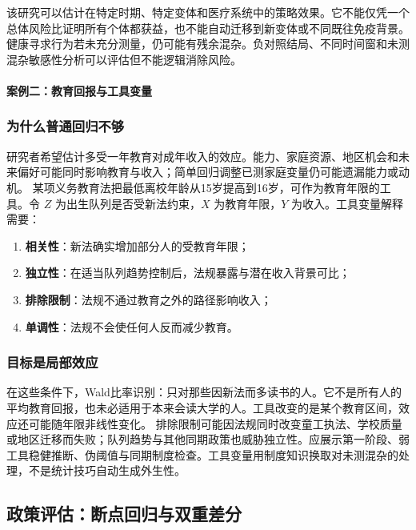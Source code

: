 该研究可以估计在特定时期、特定变体和医疗系统中的策略效果。它不能仅凭一个总体风险比证明所有个体都获益，也不能自动迁移到新变体或不同既往免疫背景。健康寻求行为若未充分测量，仍可能有残余混杂。负对照结局、不同时间窗和未测混杂敏感性分析可以评估但不能逻辑消除风险。

\paragraph{案例二：教育回报与工具变量}

\subsubsection{为什么普通回归不够}

研究者希望估计多受一年教育对成年收入的效应。能力、家庭资源、地区机会和未来偏好可能同时影响教育与收入；简单回归调整已测家庭变量仍可能遗漏能力或动机。
某项义务教育法把最低离校年龄从15岁提高到16岁，可作为教育年限的工具。令 $Z$ 为出生队列是否受新法约束，$X$ 为教育年限，$Y$ 为收入。工具变量解释需要：

\begin{enumerate}
  \item \textbf{相关性}：新法确实增加部分人的受教育年限；
  \item \textbf{独立性}：在适当队列趋势控制后，法规暴露与潜在收入背景可比；
  \item \textbf{排除限制}：法规不通过教育之外的路径影响收入；
  \item \textbf{单调性}：法规不会使任何人反而减少教育。
\end{enumerate}

\subsubsection{目标是局部效应}

在这些条件下，Wald比率识别：只对那些因新法而多读书的人。它不是所有人的平均教育回报，也未必适用于本来会读大学的人。工具改变的是某个教育区间，效应还可能随年限非线性变化。
排除限制可能因法规同时改变童工执法、学校质量或地区迁移而失败；队列趋势与其他同期政策也威胁独立性。应展示第一阶段、弱工具稳健推断、伪阈值与同期制度检查。工具变量用制度知识换取对未测混杂的处理，不是统计技巧自动生成外生性。

\subsection{政策评估：断点回归与双重差分}

